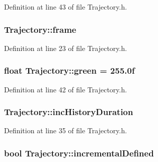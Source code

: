 Definition at line 43 of file Trajectory.\+h.

\hypertarget{class_trajectory_a37e42637b529f9939b499600a07d2660}{
\subsubsection[{frame}]{ Trajectory\+::frame\hspace{0.3cm}{\ttfamily [protected]}}}\label{class_trajectory_a37e42637b529f9939b499600a07d2660}


Definition at line 23 of file Trajectory.\+h.

\hypertarget{class_trajectory_a26301a3b5552b8dabc1b620a426fbcf0}{
\subsubsection[{green}]{\setlength{\rightskip}{0pt plus 5cm}float Trajectory\+::green = 255.\+0f\hspace{0.3cm}{\ttfamily [protected]}}}\label{class_trajectory_a26301a3b5552b8dabc1b620a426fbcf0}


Definition at line 42 of file Trajectory.\+h.

\hypertarget{class_trajectory_a7330cbb6db806aefd41b22fcedb00e83}{
\subsubsection[{inc\+History\+Duration}]{ Trajectory\+::inc\+History\+Duration\hspace{0.3cm}{\ttfamily [protected]}}}\label{class_trajectory_a7330cbb6db806aefd41b22fcedb00e83}


Definition at line 35 of file Trajectory.\+h.

\hypertarget{class_trajectory_ac51564d2490c6d02fce1b28d67afe8e6}{
\subsubsection[{incremental\+Defined}]{\setlength{\rightskip}{0pt plus 5cm}bool Trajectory\+::incremental\+Defined\hspace{0.3cm}{\ttfamily [protected]}}}\label{class_trajectory_ac51564d2490c6d02fce1b28d67afe8e6}


